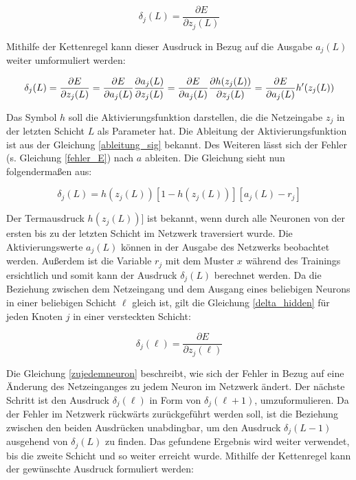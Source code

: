 \begin{equation}
\label{delta_hidden}
\delta_j(L) = \frac{\partial E}{\partial z_j(L)}
\end{equation}


Mithilfe der Kettenregel kann dieser Ausdruck in Bezug auf die Ausgabe $a_j(L)$ weiter umformuliert werden:

\begin{equation}
\delta_j(L) = \frac{\partial E}{\partial z_j(L)} = \frac{\partial E}{\partial a_j(L)}\frac{\partial a_j(L)}{\partial z_j(L)} = \frac{\partial E}{\partial a_j(L)}\frac{\partial h(z_j(L))}{\partial z_j(L)}
\newline =  \frac{\partial E}{\partial a_j(L)}h'(z_j(L))
\end{equation}

Das Symbol $h$ soll die Aktivierungsfunktion darstellen, die die Netzeingabe $z_j$ in der letzten Schicht $L$ als Parameter hat. Die Ableitung der Aktivierungsfunktion ist aus der Gleichung \ref{ableitung_sig} bekannt. Des Weiteren lässt sich der Fehler (s. Gleichung \ref{fehler_E}) nach $a$ ableiten. Die Gleichung sieht nun folgendermaßen aus:  

\begin{equation}
\delta_j(L) = h(z_j(L))[1 - h(z_j(L))] [a_j(L) - r_j]
\end{equation}

Der Termausdruck $h(z_j(L))]$ ist bekannt, wenn durch alle Neuronen von der ersten bis zu der letzten Schicht im Netzwerk traversiert wurde. Die Aktivierungswerte $a_j(L)$ können in der Ausgabe des Netzwerks beobachtet werden. Außerdem ist die Variable $r_j$ mit dem Muster $x$ während des Trainings ersichtlich und somit kann der Ausdruck $\delta_j(L)$ berechnet werden. 
Da die Beziehung zwischen dem Netzeingang und dem Ausgang eines beliebigen Neurons in einer beliebigen Schicht $\ell$ gleich ist, gilt die Gleichung \ref{delta_hidden} für jeden Knoten $j$ in einer versteckten Schicht:

\begin{equation}
\label{zujedemneuron}
\delta_j(\ell) = \frac{\partial E}{\partial z_j(\ell)}
\end{equation}

Die Gleichung \ref{zujedemneuron} beschreibt, wie sich der Fehler in Bezug auf eine Änderung des Netzeinganges zu jedem Neuron im Netzwerk ändert. Der nächste Schritt ist den Ausdruck $\delta_j(\ell)$ in Form von $\delta_j(\ell + 1)$, umzuformulieren. Da der Fehler im Netzwerk rückwärts zurückgeführt werden soll, ist die Beziehung zwischen den beiden Ausdrücken unabdingbar, um den Ausdruck $\delta_j(L - 1)$ ausgehend von $\delta_j(L)$ zu finden. Das gefundene Ergebnis wird weiter verwendet, bis die zweite Schicht und so weiter erreicht wurde. Mithilfe der Kettenregel kann der gewünschte Ausdruck formuliert werden:

